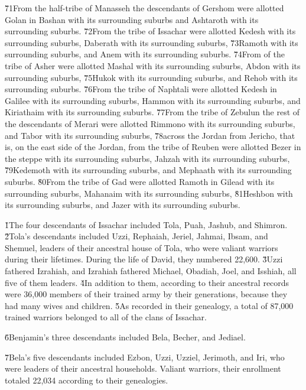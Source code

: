 \v{71}From the half-tribe of Manasseh the descendants of Gershom were allotted Golan in Bashan with its surrounding suburbs and Ashtaroth with its surrounding suburbs. \v{72}From the tribe of Issachar were allotted Kedesh with its surrounding suburbs, Daberath with its surrounding suburbs, \v{73}Ramoth with its surrounding suburbs, and Anem with its surrounding suburbs. \v{74}From of the tribe of Asher were allotted Mashal with its surrounding suburbs, Abdon with its surrounding suburbs, \v{75}Hukok with its surrounding suburbs, and Rehob with its surrounding suburbs. \v{76}From the tribe of Naphtali were allotted Kedesh in Galilee with its surrounding suburbs, Hammon with its surrounding suburbs, and Kiriathaim with its surrounding suburbs. \v{77}From the tribe of Zebulun the rest of the descendants of Merari were allotted Rimmono with its surrounding suburbs, and Tabor with its surrounding suburbs, \v{78}across the Jordan from Jericho, that is, on the east side of the Jordan, from the tribe of Reuben were allotted Bezer in the steppe with its surrounding suburbs, Jahzah with its surrounding suburbs, \v{79}Kedemoth with its surrounding suburbs, and Mephaath with its surrounding suburbs. \v{80}From the tribe of Gad were allotted Ramoth in Gilead with its surrounding suburbs, Mahanaim with its surrounding suburbs, \v{81}Heshbon with its surrounding suburbs, and Jazer with its surrounding suburbs.

\v{1}The four descendants of Issachar included Tola, Puah, Jashub, and Shimron. \v{2}Tola's descendants included Uzzi, Rephaiah, Jeriel, Jahmai, Ibsam, and Shemuel, leaders of their ancestral house of Tola, who were valiant warriors during their lifetimes. During the life of David, they numbered 22,600. \v{3}Uzzi fathered Izrahiah, and Izrahiah fathered Michael, Obadiah, Joel, and Isshiah, all five of them leaders. \v{4}In addition to them, according to their ancestral records were 36,000 members of their trained army by their generations, because they had many wives and children. \v{5}As recorded in their genealogy, a total of 87,000 trained warriors belonged to all of the clans of Issachar.

\v{6}Benjamin's three descendants included Bela, Becher, and Jediael.

\v{7}Bela's five descendants included Ezbon, Uzzi, Uzziel, Jerimoth, and Iri, who were leaders of their ancestral households. Valiant warriors, their enrollment totaled 22,034 according to their genealogies.

